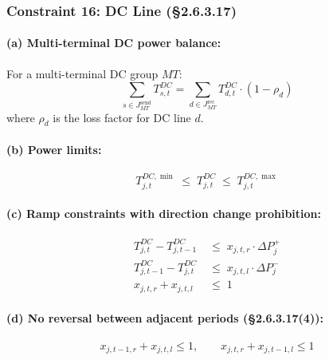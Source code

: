 \subsubsection{Constraint 16: DC Line (§2.6.3.17)}\label{sec:scuc-dc}

\paragraph{(a) Multi-terminal DC power balance:}
For a multi-terminal DC group $MT$:
\begin{equation}\label{eq:mt-balance}
  \sum_{s \in J^{\mathrm{send}}_{MT}} T^{DC}_{s,t}
  = \sum_{d \in J^{\mathrm{rec}}_{MT}} T^{DC}_{d,t} \cdot (1 - \rho_d)
\end{equation}
where $\rho_d$ is the loss factor for DC line $d$.

\paragraph{(b) Power limits:}
\begin{equation}\label{eq:dc-limits}
  T^{DC,\min}_{j,t} \;\leq\; T^{DC}_{j,t} \;\leq\; T^{DC,\max}_{j,t}
\end{equation}

\paragraph{(c) Ramp constraints with direction change prohibition:}
\begin{align}
  T^{DC}_{j,t} - T^{DC}_{j,t-1} &\;\leq\; x_{j,t,r} \cdot \Delta P^{+}_j \label{eq:dc-ramp-up}\\
  T^{DC}_{j,t-1} - T^{DC}_{j,t} &\;\leq\; x_{j,t,l} \cdot \Delta P^{-}_j \label{eq:dc-ramp-dn}\\
  x_{j,t,r} + x_{j,t,l} &\;\leq\; 1 \label{eq:dc-ramp-excl}
\end{align}

\paragraph{(d) No reversal between adjacent periods (§2.6.3.17(4)):}
\begin{equation}\label{eq:dc-no-reversal}
  x_{j,t-1,r} + x_{j,t,l} \leq 1, \qquad
  x_{j,t,r} + x_{j,t-1,l} \leq 1
\end{equation}

